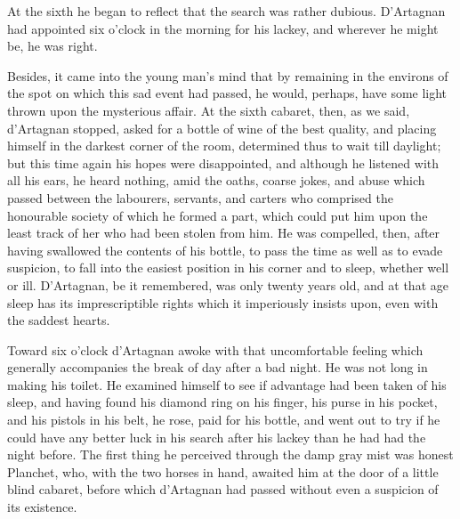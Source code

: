 At the sixth he began to reflect that the search was rather dubious. D'Artagnan had appointed six o'clock in the morning for his lackey, and wherever he might be, he was right. 

Besides, it came into the young man's mind that by remaining in the environs of the spot on which this sad event had passed, he would, perhaps, have some light thrown upon the mysterious affair. At the sixth cabaret, then, as we said, d'Artagnan stopped, asked for a bottle of wine of the best quality, and placing himself in the darkest corner of the room, determined thus to wait till daylight; but this time again his hopes were disappointed, and although he listened with all his ears, he heard nothing, amid the oaths, coarse jokes, and abuse which passed between the labourers, servants, and carters who comprised the honourable society of which he formed a part, which could put him upon the least track of her who had been stolen from him. He was compelled, then, after having swallowed the contents of his bottle, to pass the time as well as to evade suspicion, to fall into the easiest position in his corner and to sleep, whether well or ill. D'Artagnan, be it remembered, was only twenty years old, and at that age sleep has its imprescriptible rights which it imperiously insists upon, even with the saddest hearts. 

Toward six o'clock d'Artagnan awoke with that uncomfortable feeling which generally accompanies the break of day after a bad night. He was not long in making his toilet. He examined himself to see if advantage had been taken of his sleep, and having found his diamond ring on his finger, his purse in his pocket, and his pistols in his belt, he rose, paid for his bottle, and went out to try if he could have any better luck in his search after his lackey than he had had the night before. The first thing he perceived through the damp gray mist was honest Planchet, who, with the two horses in hand, awaited him at the door of a little blind cabaret, before which d'Artagnan had passed without even a suspicion of its existence.